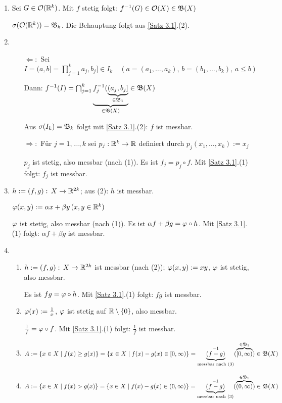 \documentclass[a4paper,twoside,DIV15,BCOR12mm,chapterprefix=true,headings=onelinechapter]{scrbook}
\begin{document}
\begin{beweis}
\begin{enumerate}
\item Sei \(G\in\mathcal{O}(\mathbb{R}^{k})\). Mit \(f\) stetig folgt: \(f^{-1}(G)\in\mathcal{O}(X)\in\mathfrak{B}(X)\)

\(\sigma(\mathcal{O}(\mathbb{R}^{k}))=\mathfrak{B}_{k}\). Die Behauptung folgt aus \ref{Satz 3.1}.(2).
\item \begin{itemize}
\item[\(\Leftarrow:\)] Sei \(I=(a,b]=\prod_{j=1}^{k}{a_{j},b_{j}]}\in I_{k}\quad (a=(a_{1},\ldots,a_{k}),\,b=(b_{1},\ldots,b_{k}),\,a\leq b)\)

Dann: \(f^{-1}(I)=\bigcap_{j=1}^{k}{\underbrace{f_{j}^{-1}(\underbrace{(a_{j},b_{j}]}_{\in\mathfrak{B}_{1}}}_{\in\mathfrak{B}(X)}}\in\mathfrak{B}(X)\)

Aus \(\sigma(I_{k})=\mathfrak{B}_{k}\) folgt mit \ref{Satz 3.1}.(2): \(f\) ist messbar.
\item[\(\Rightarrow:\)] F\"ur \(j=1,...,k\) sei \(p_{j}:\mathbb{R}^{k}\to\mathbb{R}\) definiert durch 
\(p_{j}(x_{1},\ldots,x_{k}):=x_{j}\)

\(p_{j}\) ist stetig, also messbar (nach (1)). Es ist \(f_{j}=p_{j}\circ f\). Mit \ref{Satz 3.1}.(1) folgt: \(f_{j}\) ist
messbar.
\end{itemize}
\item \(h:=(f,g):\,X\to\mathbb{R}^{2k}\); aus (2): \(h\) ist messbar.

\(\varphi(x,y):=\alpha x+\beta y\,(x,y\in\mathbb{R}^{k})\)

\(\varphi\) ist stetig, also messbar (nach (1)). Es ist \(\alpha f+\beta g=\varphi\circ h\). Mit \ref{Satz 3.1}.(1) folgt: 
\(\alpha f+\beta g\) ist messbar.
\item 
\begin{enumerate}
\item \(h:=(f,g):\,X\to\mathbb{R}^{2k}\) ist messbar (nach (2)); \(\varphi(x,y):=xy\), \(\varphi\) ist stetig, also messbar.

Es ist \(fg=\varphi\circ h\). Mit \ref{Satz 3.1}.(1) folgt: \(fg\) ist messbar.
\item \(\varphi(x):=\frac{1}{x}\), \(\varphi\) ist stetig auf \(\mathbb{R}\setminus\{0\}\), also messbar.

\(\frac{1}{f}=\varphi\circ f\). Mit \ref{Satz 3.1}.(1) folgt: \(\frac{1}{f}\) ist messbar.
\item \(A:=\{x\in X\mid f(x)\geq g(x)\}=\{x\in X\mid f(x)-g(x)\in[0,\infty)\}=\underbrace{(f-g)}_{\text{messbar nach (3)}}^{-1}(\overbrace{[0,\infty)}^{\in\mathfrak{B}_{1}})\in\mathfrak{B}(X)\)

\item \(A:=\{x\in X\mid f(x)>g(x)\}=\{x\in X\mid f(x)-g(x)\in(0,\infty)\}=\underbrace{(f-g)}_{\text{messbar nach (3)}}^{-1}(\overbrace{(0,\infty)}^{\in\mathfrak{B}_{1}})\in\mathfrak{B}(X)\)
\end{enumerate}
\end{enumerate}
\end{beweis}
\end{document}
